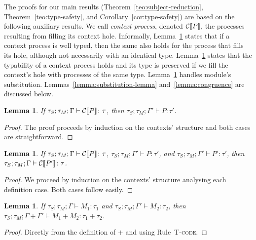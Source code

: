 \documentclass[copyright,creativecommons]{eptcs}
\newcommand{\methJoin}{+}
\newcommand{\mkTrule}[1]{{\footnotesize \textsc{T-#1}}}
\newcommand{\type}{\vdash}
\newcommand{\is}{\colon}
\newcommand{\Tcode}{\mkTrule{code}}
\newtheorem{lemma}[theorem]{Lemma}
\begin{document}
The proofs for our main results (Theorem~\ref{teo:subject-reduction},
Theorem~\ref{teo:type-safety}, and Corollary~\ref{cor:type-safety})
are based on the following auxiliary results.
We call \textit{context process}, denoted $\mathcal{C}[\![ P]\!]$, the
processes resulting from filling its context hole.
Informally, Lemma~\ref{lemma:context-process} states that if a context
process is well typed, then the same also holds for the process that
fills its hole, although not necessarily with an identical type.
Lemma~\ref{lemma:process-context} states that the typability of a
context process holds and its type is preserved if we fill the context's
hole with processes of the same type.
Lemma~\ref{lemma:module-substitution} handles module's substitution.
Lemmas~\ref{lemma:substitution-lemma} and~\ref{lemma:congruence} are
discussed below.

\begin{lemma}
  \label{lemma:context-process}
  If $\tau_S; \tau_M;\Gamma \type \context P \is \tau$, then $\tau_S;
  \tau_M;\Gamma' \type P \is \tau'$.
\end{lemma}

\begin{proof}
  The proof proceeds by induction on the contexts' structure and
  both cases are straightforward. 
\end{proof}

\begin{lemma}
  \label{lemma:process-context}
  If $\tau_S; \tau_M;\Gamma \type \context P \is \tau$, $\tau_S;
  \tau_M; \Gamma' \type P \is \tau'$, and $\tau_S; \tau_M;\Gamma' \type P' \is
  \tau'$, then $\tau_S; \tau_M;\Gamma \type \context {P'} \is \tau$.
\end{lemma}

\begin{proof}
  We proceed by induction on the contexts' structure analysing each 
  definition case. Both cases follow easily.
\end{proof}

\begin{lemma}
  \label{lemma:module-substitution}
  If $\tau_S; \tau_M;\Gamma \type M_1 \is \tau_1$ and $\tau_S; \tau_M;\Gamma'
  \type M_2 \is \tau_2$, 
  then $\tau_S; \tau_M; \Gamma + \Gamma' \type M_1 \methJoin 
  M_2 \is \tau_1 \methJoin \tau_2$.
\end{lemma}

\begin{proof}
  Directly from the definition of $\methJoin$ and using Rule~\Tcode.
\end{proof}
\end{document}

